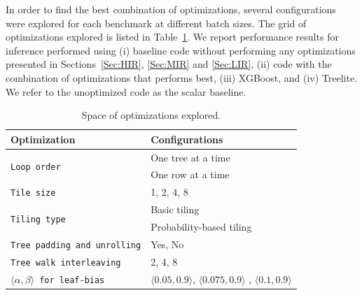 In order to find the best combination of optimizations, several configurations were explored
for each benchmark at different batch sizes. The grid of optimizations explored is listed in Table~\ref{Tab:Optimizations}. 
We report performance results for inference performed using (i) \Treebeard{} baseline code without performing any optimizations
presented in Sections~\ref{Sec:HIR}, \ref{Sec:MIR} and \ref{Sec:LIR}, (ii) \Treebeard{} code with the combination of optimizations that performs best,
(iii) XGBoost, and (iv) Treelite. We refer to the unoptimized \Treebeard{} code as the scalar baseline.
\begin{table}[htbp]
  \small{
  \begin{tabularx}{\linewidth}{l l}
   \toprule
   \textbf{Optimization} & \textbf{Configurations}\\
   \midrule
   \multirow{2}{*}{\texttt{Loop order}} &  One tree at a time\\
                       &  One row at a time\\
   \midrule
   \texttt{Tile size} & 1, 2, 4, 8 \\
   \midrule
   \multirow{2}{*}{\texttt{Tiling type}} & Basic tiling\\
   & Probability-based tiling \\
   \midrule
   \texttt{Tree padding and unrolling} & Yes, No \\
   \midrule
   \texttt{Tree walk interleaving} & 2, 4, 8 \\
   \midrule
   \texttt{$\langle \alpha, \beta\rangle$ for leaf-bias} &  $\langle0.05, 0.9 \rangle$, $\langle0.075, 0.9 \rangle$ , $\langle 0.1, 0.9 \rangle$ \\
     \bottomrule
  \end{tabularx}
  \vskip 5pt
  \caption{\label{Tab:Optimizations}Space of optimizations explored.}
  }
\end{table}
